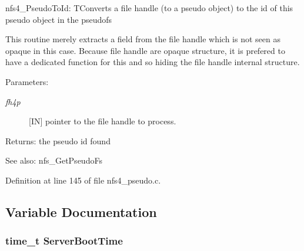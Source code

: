 nfs4\_\-Pseudo\-To\-Id: TConverts a file handle (to a pseudo object) to the id of this pseudo object in the pseudofs

This routine merely extracts a field from the file handle which is not seen as opaque in this case. Because file handle are opaque structure, it is prefered to have a dedicated function for this and so hiding the file handle internal structure.

\begin{Desc}
\item[Parameters:]
\begin{description}
\item[{\em fh4p}][IN] pointer to the file handle to process.\end{description}
\end{Desc}
\begin{Desc}
\item[Returns:]the pseudo id found \end{Desc}
\begin{Desc}
\item[See also:]nfs\_\-Get\-Pseudo\-Fs \end{Desc}


Definition at line 145 of file nfs4\_\-pseudo.c.

\subsection{Variable Documentation}
\subsubsection{\setlength{\rightskip}{0pt plus 5cm}time\_\-t {\bf Server\-Boot\-Time}}\label{nfs4__pseudo_8c_a13}


